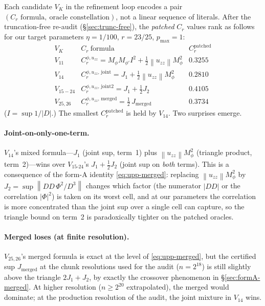 \documentclass[11pt]{article}
\theoremstyle{definition}
\newcommand{\norm}[1]{\left\lVert#1\right\rVert}
\begin{document}
Each candidate $V_K$ in the refinement loop encodes a pair
$(\text{$C_r$ formula},\ \text{oracle constellation})$, not a linear sequence of
literals. After the truncation-free re-audit (\S\ref{sec:trunc-free}), the
\emph{patched} $C_r$ values rank as follows for our target parameters
$\eta=1/100$, $r=23/25$, $p_{\max}=1$:
\[
\begin{array}{c|l|c}
   V_K & C_r\ \text{formula} & C_r^{\mathrm{patched}} \\\hline
   V_{11} & C_r^{\phi,u_{zz}} = M_\phi M_{\phi'} I^2 + \tfrac12 \norm{u_{zz}} M_\phi^2 & 0.3255 \\
   V_{14} & C_r^{\phi,u_{zz},\,\mathrm{joint}} = J_1 + \tfrac12 \norm{u_{zz}} M_\phi^2 & \mathbf{0.2810} \\
   V_{15-24} & C_r^{\phi,u_{zz},\,\mathrm{joint2}} = J_1 + \tfrac12 J_2 & 0.4105 \\
   V_{25,26} & C_r^{\phi,u_{zz},\,\mathrm{merged}} = \tfrac12\,J_{\mathrm{merged}} & 0.3734
\end{array}
\]
($I=\sup 1/|D|$.)
The smallest $C_r^{\mathrm{patched}}$ is held by $V_{14}$. Two surprises emerge.

\paragraph{Joint-on-only-one-term.}
$V_{14}$'s mixed formula---$J_1$ (joint sup, term~1) plus $\norm{u_{zz}} M_\phi^2$
(triangle product, term~2)---wins over $V_{15\text{-}24}$'s
$J_1+\tfrac12 J_2$ (joint sup on \emph{both} terms). This is a consequence of the
form-A identity \eqref{eq:upp-merged}: replacing $\norm{u_{zz}} M_\phi^2$ by
$J_2 = \sup\norm{DD\,\Phi^2/D^3}$ changes which factor (the numerator $|DD|$ or the
correlation $|\Phi|^2$) is taken on its worst cell, and at our parameters the
correlation is more concentrated than the joint sup over a single cell can capture,
so the triangle bound on term~2 is paradoxically tighter on the patched oracles.

\paragraph{Merged loses (at finite resolution).}
$V_{25,26}$'s merged formula is exact at the level of \eqref{eq:upp-merged}, but the
certified sup $J_{\mathrm{merged}}$ at the chunk resolutions used for the audit
($n=2^{18}$) is still slightly above the triangle $2J_1+J_2$, by exactly the
crossover phenomenon in \S\ref{sec:formA-merged}. At higher resolution
($n\ge 2^{20}$ extrapolated), the merged would dominate; at the production resolution
of the audit, the joint mixture in $V_{14}$ wins.
\end{document}
